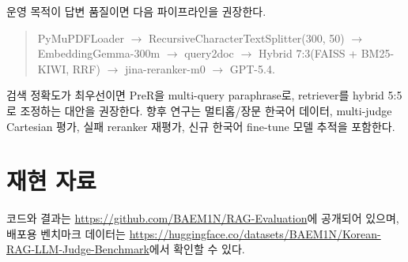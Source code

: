 \documentclass[10pt,a4paper,twocolumn]{article}
\begin{document}
운영 목적이 답변 품질이면 다음 파이프라인을 권장한다.
\begin{quote}\small
PyMuPDFLoader $\rightarrow$ RecursiveCharacterTextSplitter(300, 50) $\rightarrow$ EmbeddingGemma-300m $\rightarrow$ query2doc $\rightarrow$ Hybrid 7:3(FAISS + BM25-KIWI, RRF) $\rightarrow$ jina-reranker-m0 $\rightarrow$ GPT-5.4.
\end{quote}
검색 정확도가 최우선이면 PreR을 multi-query paraphrase로, retriever를 hybrid 5:5로 조정하는 대안을 권장한다. 향후 연구는 멀티홉/장문 한국어 데이터, multi-judge Cartesian 평가, 실패 reranker 재평가, 신규 한국어 fine-tune 모델 추적을 포함한다.

\section*{재현 자료}
코드와 결과는 \url{https://github.com/BAEM1N/RAG-Evaluation}에 공개되어 있으며, 배포용 벤치마크 데이터는 \url{https://huggingface.co/datasets/BAEM1N/Korean-RAG-LLM-Judge-Benchmark}에서 확인할 수 있다.
\end{document}
